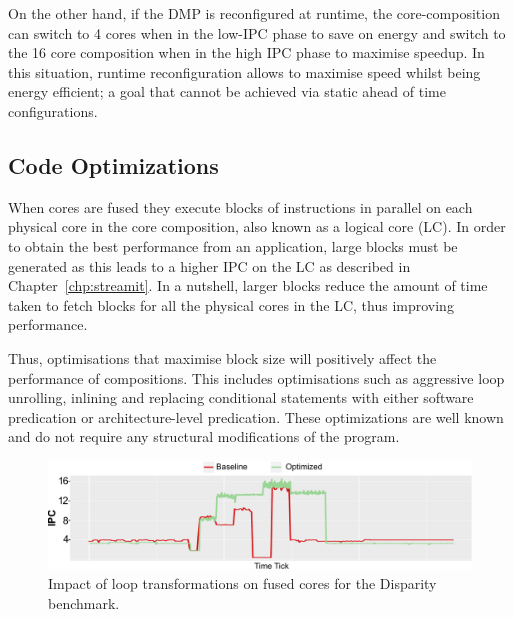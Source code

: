 On the other hand, if the DMP is reconfigured at runtime, the core-composition can switch to 4 cores when in the low-IPC phase to save on energy and switch to the 16 core composition when in the high IPC phase to maximise speedup.
In this situation, runtime reconfiguration allows to maximise speed whilst being energy efficient; a goal that cannot be achieved via static ahead of time configurations.

\subsection{Code Optimizations}

When cores are fused they execute blocks of instructions in parallel on each physical core in the core composition, also known as a logical core (LC).
In order to obtain the best performance from an application, large blocks must be generated as this leads to a higher IPC on the LC as described in Chapter~\ref{chp:streamit}.
In a nutshell, larger blocks reduce the amount of time taken to fetch blocks for all the physical cores in the LC, thus improving performance.

Thus, optimisations that maximise block size will positively affect the performance of compositions.
This includes optimisations such as aggressive loop unrolling, inlining and replacing conditional statements with either software predication or architecture-level predication.
These optimizations are well known and do not require any structural modifications of the program.

\begin{figure}[t]
    \includegraphics[width=\textwidth]{cases-paper/graphics/motivation/code_opt_3.pdf}
    \caption{Impact of loop transformations on fused cores for the Disparity benchmark.} 
    \label{fig:compmotiv}
\vspace{1em}
\end{figure}

